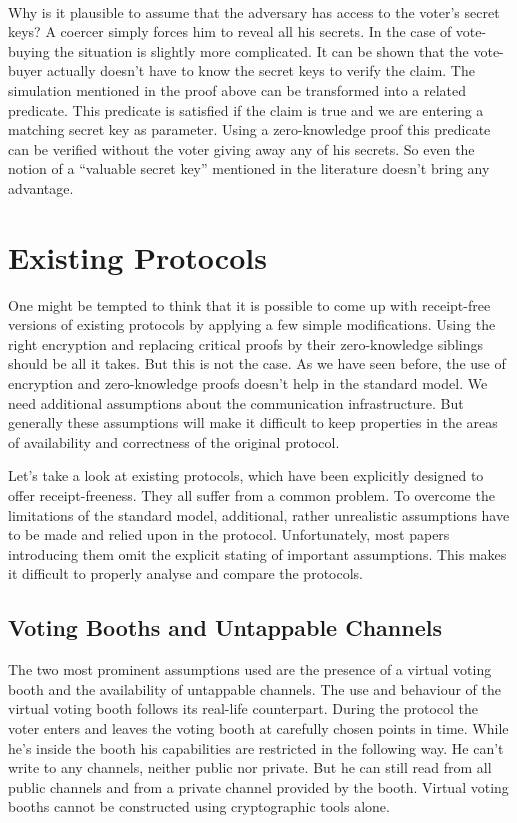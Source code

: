 \documentclass{article}
\begin{document}
\paragraph{}
Why is it plausible to assume that the adversary has access to the voter's secret keys?
A coercer simply forces him to reveal all his secrets. In the case of vote-buying the situation is slightly more complicated. It can be shown that the vote-buyer actually doesn't have to know the secret keys to verify the claim. The simulation mentioned in the proof above can be transformed into a related predicate. This predicate is satisfied if the claim is true and we are entering a matching secret key as parameter. Using a zero-knowledge proof this predicate can be verified without the voter giving away any of his secrets.
So even the notion of a ``valuable secret key'' mentioned in the literature doesn't bring any advantage.



\section{Existing Protocols}
One might be tempted to think that it is possible to come up with receipt-free versions of existing protocols by applying a few simple modifications. Using the right encryption and replacing critical proofs by their zero-knowledge siblings should be all it takes. But this is not the case. As we have seen before, the use of encryption and zero-knowledge proofs doesn't help in the standard model.
We need additional assumptions about the communication infrastructure. But generally these assumptions will make it difficult to keep properties in the areas of availability and correctness of the original protocol.

Let's take a look at existing protocols, which have been explicitly designed to offer receipt-freeness. They all suffer from a common problem. To overcome the limitations of the standard model, additional, rather unrealistic assumptions have to be made and relied upon in the protocol. Unfortunately, most papers introducing them omit the explicit stating of important assumptions. This makes it difficult to properly analyse and compare the protocols.


\subsection{Voting Booths and Untappable Channels}
The two most prominent assumptions used are the presence of a virtual voting booth and the availability of untappable channels.
The use and behaviour of the virtual voting booth follows its real-life counterpart. During the protocol the voter enters and leaves the voting booth at carefully chosen points in time. While he's inside the booth his capabilities are restricted in the following way. He can't write to any channels, neither public nor private. But he can still read from all public channels and from a private channel provided by the booth. Virtual voting booths cannot be constructed using cryptographic tools alone.
\end{document}
